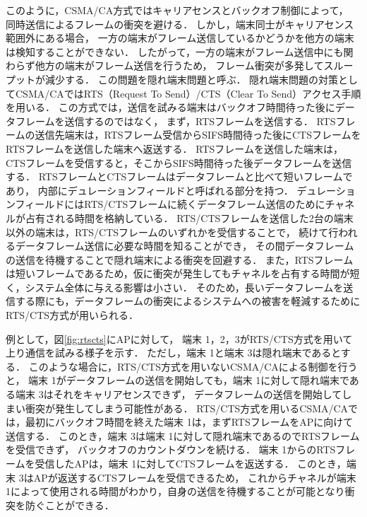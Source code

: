 \documentclass[master]{kuisthesis}		%
\begin{document}
			\par
			このように，CSMA/CA方式ではキャリアセンスとバックオフ制御によって，
			同時送信によるフレームの衝突を避ける．
			しかし，端末同士がキャリアセンス範囲外にある場合，
			一方の端末がフレーム送信しているかどうかを他方の端末は検知することができない．
			したがって，一方の端末がフレーム送信中にも関わらず他方の端末がフレーム送信を行うため，
			フレーム衝突が多発してスループットが減少する．
			この問題を隠れ端末問題と呼ぶ．
			隠れ端末問題の対策としてCSMA/CAではRTS（Request To Send）/CTS（Clear To Send）アクセス手順を用いる．
			この方式では，送信を試みる端末はバックオフ時間待った後にデータフレームを送信するのではなく，
			まず，RTSフレームを送信する．
			RTSフレームの送信先端末は，RTSフレーム受信からSIFS時間待った後にCTSフレームをRTSフレームを送信した端末へ返送する．
			RTSフレームを送信した端末は，CTSフレームを受信すると，そこからSIFS時間待った後データフレームを送信する．
			RTSフレームとCTSフレームはデータフレームと比べて短いフレームであり，
			内部にデュレーションフィールドと呼ばれる部分を持つ．
			デュレーションフィールドにはRTS/CTSフレームに続くデータフレーム送信のためにチャネルが占有される時間を格納している．
			RTS/CTSフレームを送信した2台の端末以外の端末は，RTS/CTSフレームのいずれかを受信することで，
			続けて行われるデータフレーム送信に必要な時間を知ることができ，
			その間データフレームの送信を待機することで隠れ端末による衝突を回避する．
			また，RTSフレームは短いフレームであるため，仮に衝突が発生してもチャネルを占有する時間が短く，システム全体に与える影響は小さい．
			そのため，長いデータフレームを送信する際にも，データフレームの衝突によるシステムへの被害を軽減するためにRTS/CTS方式が用いられる．


			\par
			例として，図\ref{fig:rtscts}にAPに対して，
			端末 1，2，3がRTS/CTS方式を用いて上り通信を試みる様子を示す．
			ただし，端末 1と端末 3は隠れ端末であるとする．
			このような場合に，RTS/CTS方式を用いないCSMA/CAによる制御を行うと，
			端末 1がデータフレームの送信を開始しても，端末 1に対して隠れ端末である端末 3はそれをキャリアセンスできず，
			データフレームの送信を開始してしまい衝突が発生してしまう可能性がある．
			RTS/CTS方式を用いるCSMA/CAでは，最初にバックオフ時間を終えた端末 1は，まずRTSフレームをAPに向けて送信する．
			このとき，端末 3は端末 1に対して隠れ端末であるのでRTSフレームを受信できず，
			バックオフのカウントダウンを続ける．
			端末 1からのRTSフレームを受信したAPは，端末 1に対してCTSフレームを返送する．
			このとき，端末 3はAPが返送するCTSフレームを受信できるため，
			これからチャネルが端末 1によって使用される時間がわかり，自身の送信を待機することが可能となり衝突を防ぐことができる．
\end{document}
